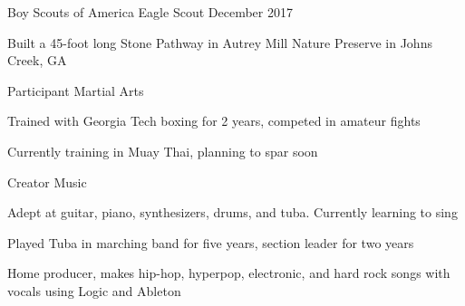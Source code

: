 \documentclass[11pt, a4paper]{awesome-cv}
\begin{document}
\makecvheader[C]







\begin{cventries}
\cventry
    {Boy Scouts of America} %
    {Eagle Scout} %
    {} %
    {December 2017} %
    {
      \begin{cvitems} %
        \item {Built a 45-foot long Stone Pathway in Autrey Mill Nature Preserve in Johns Creek, GA}
      \end{cvitems}
    }
\end{cventries}

\begin{cventries}
\cventry
    {Participant} %
    {Martial Arts} %
    {} %
    {} %
    {
      \begin{cvitems} %
        \item {Trained with Georgia Tech boxing for 2 years, competed in amateur fights}
        \item {Currently training in Muay Thai, planning to spar soon}
      \end{cvitems}
    }
\cventry
    {Creator} %
    {Music} %
    {} %
    {} %
    {
      \begin{cvitems} %
        \item {Adept at guitar, piano, synthesizers, drums, and tuba. Currently learning to sing}
        \item {Played Tuba in marching band for five years, section leader for two years}
        \item {Home producer, makes hip-hop, hyperpop, electronic, and hard rock songs with vocals using Logic and Ableton}
      \end{cvitems}
    }
\end{cventries}

\end{document}
